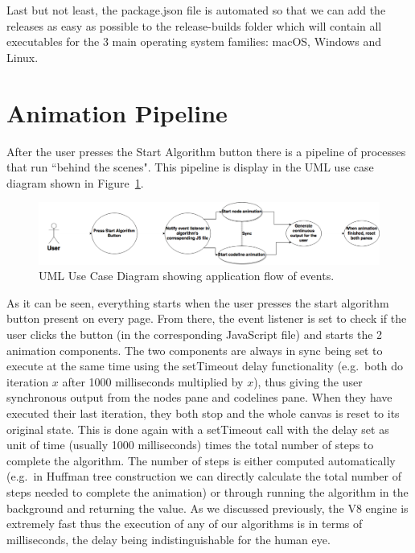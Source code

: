 \documentclass{l4proj}
\begin{document}
Last but not least, the package.json file is automated so that we can add the releases as easy as possible to the
release-builds folder which will contain all executables for the 3 main operating system families: macOS, Windows and
Linux.

\section{Animation Pipeline}

After the user presses the Start Algorithm button there is a pipeline of processes that run ``behind the
scenes". This pipeline is display in the UML use case diagram shown in
Figure~\ref{fig:animation_uml_use_case_diagram}.

\pagebreak

\begin{figure}[!ht]
    \centering
    \includegraphics[scale=0.3]{animation_uml_use_case_diagram}
    \caption{UML Use Case Diagram showing application flow of events.}
    \label{fig:animation_uml_use_case_diagram}
\end{figure}

As it can be seen, everything starts when the user presses the start algorithm button present on every page. From
there, the event listener is set to check if the user clicks the button (in the corresponding JavaScript
file) and starts the 2 animation components. The two components are always in sync being set to execute at the same time using the setTimeout delay functionality (e.g.\ both do iteration $x$ after 1000 milliseconds multiplied by $x$), thus giving the user
synchronous output from the nodes pane and codelines pane. When they have executed their last iteration, they
both stop and the whole canvas is reset to its original state. This is done again with a setTimeout call with the delay
set as unit of time (usually 1000 milliseconds) times the total number of steps to complete the algorithm. The number
of steps is either computed automatically (e.g.\ in Huffman tree construction we can directly calculate the total number
of steps needed to complete the animation) or through running the algorithm in the background and returning the value.
As we discussed previously, the V8 engine is extremely fast thus the execution of any of our algorithms is in terms of
milliseconds, the delay being indistinguishable for the human eye. 
\end{document}
